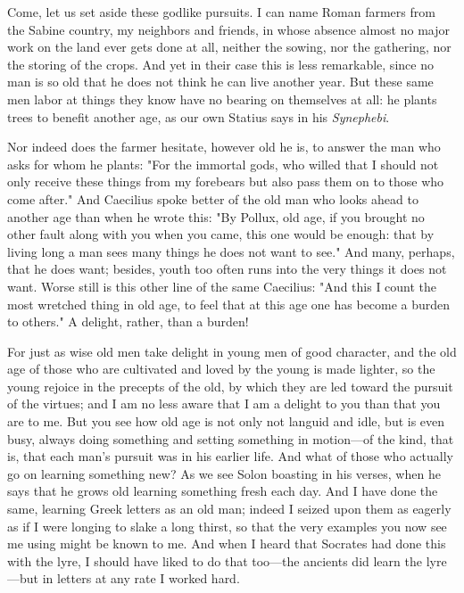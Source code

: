  Come, let us set aside these godlike pursuits. I can name Roman farmers from the Sabine country, my neighbors and friends, in whose absence almost no major work on the land ever gets done at all, neither the sowing, nor the gathering, nor the storing of the crops. And yet in their case this is less remarkable, since no man is so old that he does not think he can live another year. But these same men labor at things they know have no bearing on themselves at all: he plants trees to benefit another age, as our own Statius says in his \textit{Synephebi}.

 Nor indeed does the farmer hesitate, however old he is, to answer the man who asks for whom he plants: "For the immortal gods, who willed that I should not only receive these things from my forebears but also pass them on to those who come after." And Caecilius spoke better of the old man who looks ahead to another age than when he wrote this: "By Pollux, old age, if you brought no other fault along with you when you came, this one would be enough: that by living long a man sees many things he does not want to see." And many, perhaps, that he does want; besides, youth too often runs into the very things it does not want. Worse still is this other line of the same Caecilius: "And this I count the most wretched thing in old age, to feel that at this age one has become a burden to others." A delight, rather, than a burden!

 For just as wise old men take delight in young men of good character, and the old age of those who are cultivated and loved by the young is made lighter, so the young rejoice in the precepts of the old, by which they are led toward the pursuit of the virtues; and I am no less aware that I am a delight to you than that you are to me. But you see how old age is not only not languid and idle, but is even busy, always doing something and setting something in motion—of the kind, that is, that each man's pursuit was in his earlier life. And what of those who actually go on learning something new? As we see Solon boasting in his verses, when he says that he grows old learning something fresh each day. And I have done the same, learning Greek letters as an old man; indeed I seized upon them as eagerly as if I were longing to slake a long thirst, so that the very examples you now see me using might be known to me. And when I heard that Socrates had done this with the lyre, I should have liked to do that too—the ancients did learn the lyre—but in letters at any rate I worked hard.

